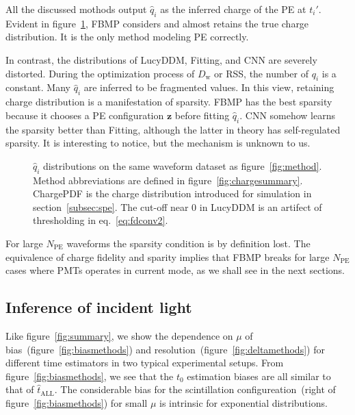 All the discussed mothods output $\hat{q}_i$ as the inferred charge of the PE at $t_i'$.  Evident in figure~\ref{fig:recchargehist}, FBMP considers and almost retains the true charge distribution.  It is the only method modeling PE correctly.

In contrast, the distributions of LucyDDM, Fitting, and CNN are severely distorted.  During the optimization process of $D_\mathrm{w}$ or RSS, the number of $q_i$ is a constant. Many $\hat{q}_i$ are inferred to be fragmented values.  In this view, retaining charge distribution is a manifestation of sparsity.  FBMP has the best sparsity because it chooses a PE configuration $\bm{z}$ before fitting $\hat{q}_i$.  CNN somehow learns the sparsity better than Fitting, although the latter in theory has self-regulated sparsity.  It is interesting to notice, but the mechanism is unknown to us.

\begin{figure}[H]
  \centering
  \resizebox{0.6\textwidth}{!}{}
  \caption{\label{fig:recchargehist} $\hat{q}_i$ distributions on the same waveform dataset as figure~\ref{fig:method}.  Method abbreviations are defined in figure~\ref{fig:chargesummary}. ChargePDF is the charge distribution introduced for simulation in section~\ref{subsec:spe}. The cut-off near 0 in LucyDDM is an artifect of thresholding in eq.~\eqref{eq:fdconv2}.}
\end{figure}

For large $N_\mathrm{PE}$ waveforms the sparsity condition is by definition lost.  The equivalence of charge fidelity and sparity implies that FBMP breaks for large $N_\mathrm{PE}$ cases where PMTs operates in current mode, as we shall see in the next sections.

\subsection{Inference of incident light}
\label{subsec:timeresolution}

Like figure~\ref{fig:summary}, we show the dependence on $\mu$ of bias~(figure~\ref{fig:biasmethods}) and resolution~(figure~\ref{fig:deltamethods}) for different time estimators in two typical experimental setups.  From figure~\ref{fig:biasmethods}, we see that the $t_0$ estimation biases are all similar to that of $\hat{t}_\mathrm{ALL}$. The considerable bias for the scintillation configureation~(right of figure~\ref{fig:biasmethods}) for small $\mu$ is intrinsic for exponential distributions.

